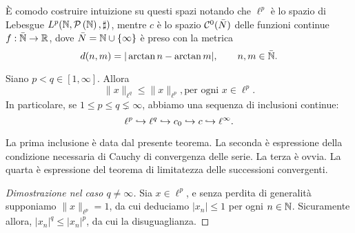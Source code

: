 È comodo costruire intuizione su questi spazi notando che $\ell^p$ è lo spazio di Lebesgue $L^p(\mathbb{N}, \mathcal{P}\left({\mathbb{N}}\right), \sharp)$, mentre $c$ è lo spazio $\mathcal{C}^0(\bar N)$ delle funzioni continue $f : \bar {\mathbb{N}} \to \mathbb{R}$, dove $\bar N = \mathbb{N} \cup \{\infty\}$ è preso con la metrica
\begin{equation*}
	d(n,m) = |\arctan n - \arctan m|, \qquad n, m \in \bar{\mathbb{N}}.
\end{equation*}

\begin{theorem}
\label{th:jensen}
	Siano $p<q \in [1, \infty]$.
	Allora
	\begin{equation*}
		\|x\|_{\ell^q} \leq \|x\|_{\ell^p}, \text{per ogni $x \in \ell^p$.}
	\end{equation*}
	In particolare, se $1 \leq p \leq q \lneq \infty$, abbiamo una sequenza di inclusioni continue:
	\begin{equation*}
		\ell^p \hookrightarrow \ell^q \hookrightarrow c_0 \hookrightarrow c \hookrightarrow \ell^\infty.
	\end{equation*}
\end{theorem}
\begin{remark}
	La prima inclusione è data dal presente teorema. La seconda è espressione della condizione necessaria di Cauchy di convergenza delle serie. La terza è ovvia. La quarta è espressione del teorema di limitatezza delle successioni convergenti.
\end{remark}
\begin{proof}[Dimostrazione nel caso $q \neq \infty$]
	Sia $x \in \ell^p$, e senza perdita di generalità supponiamo $\|x\|_{\ell^p} = 1$, da cui deduciamo $|x_n| \leq 1$ per ogni $n \in \mathbb{N}$. Sicuramente allora, $|x_n|^q \leq |x_n|^p$, da cui la disuguaglianza.
\end{proof}

